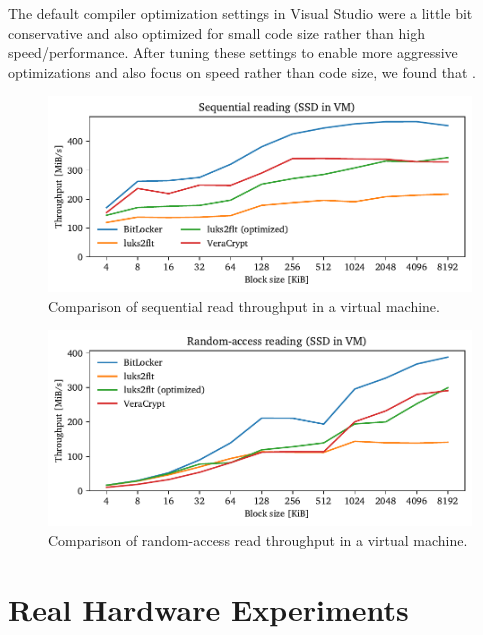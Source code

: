  The default compiler optimization settings in Visual Studio were a little bit conservative and also optimized for small code size rather than high speed/performance. After tuning these settings to enable more aggressive optimizations and also focus on speed rather than code size, we found that .

\begin{figure}[htb!]
	\center
	\includegraphics[scale=1]{../fig/performance.vmexperiments.seq.pdf}
	\caption[
		Comparison of sequential read throughput in a virtual machine
	]{
		Comparison of sequential read throughput in a virtual machine. 
	}
	\label{fig:performance.vmexperiments.rand}
\end{figure}

\begin{figure}[htb!]
	\center
	\includegraphics[scale=1]{../fig/performance.vmexperiments.rand.pdf}
	\caption[
		Comparison of random-access read throughput in a virtual machine
	]{
		Comparison of random-access read throughput in a virtual machine. 
	}
	\label{fig:performance.vmexperiments.rand}
\end{figure}

\section{Real Hardware Experiments}
\label{chap:performance.hwexperiments}

